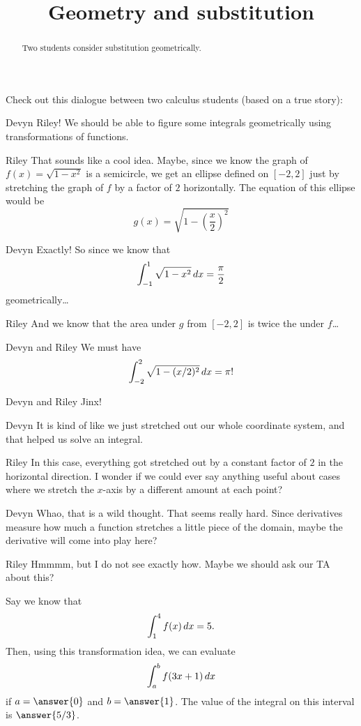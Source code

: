 \documentclass{ximera}
\title[Break-Ground:]{Geometry and substitution}
\begin{document}
\begin{abstract}
Two students consider substitution geometrically.
\end{abstract}
\maketitle


Check out this dialogue between two calculus students (based on a true
story):

\begin{dialogue}
\item[Devyn] Riley! We should be able to figure some integrals
  geometrically using transformations of functions.
\item[Riley] That sounds like a cool idea.  Maybe, since we know the
  graph of $f(x) = \sqrt{1-x^2}$ is a semicircle, we get an ellipse
  defined on $[-2,2]$ just by stretching the graph of $f$ by a factor
  of $2$ horizontally.  The equation of this ellipse would be
  \[
  g(x) =\sqrt{1-\left(\frac{x}{2}\right)^2}
  \]
\item[Devyn] Exactly!  So since we know that
  \[
  \int_{-1}^1 \sqrt{1-x^2} \mathop{}\!d x = \frac{\pi}{2}
  \]
  geometrically\dots
\item[Riley] And we know that the area under $g$ from $[-2,2]$ is
  twice the under $f$\dots
\item[Devyn and Riley] We must have
  \[
  \int_{-2}^2 \sqrt{1-(x/2)^2} \mathop{}\!d x =\pi !
  \]
\item[Devyn and Riley] Jinx!
\item[Devyn] It is kind of like we just stretched out our whole
  coordinate system, and that helped us solve an integral.
\item[Riley] In this case, everything got stretched out by a constant
  factor of $2$ in the horizontal direction.  I wonder if we could
  ever say anything useful about cases where we stretch the $x$-axis
  by a different amount at each point?
\item[Devyn] Whao, that is a wild thought.  That seems really hard.
  Since derivatives measure how much a function stretches a little
  piece of the domain, maybe the derivative will come into play here?
\item[Riley] Hmmmm, but I do not see exactly how.  Maybe we should ask
  our TA about this?
\end{dialogue}


\begin{problem}
  Say we know that
  \[
  \int_1^4 f(x) \mathop{}\!d x = 5.
  \]
  Then, using this transformation idea, we can evaluate
  \[
  \int_a^b f(3x+1)\mathop{}\!d x
  \]
  if $a= \answer{0}$ and $b=\answer{1}$.  The value of the integral on
  this interval is $\answer{5/3}$.
\end{problem}


\end{document}
